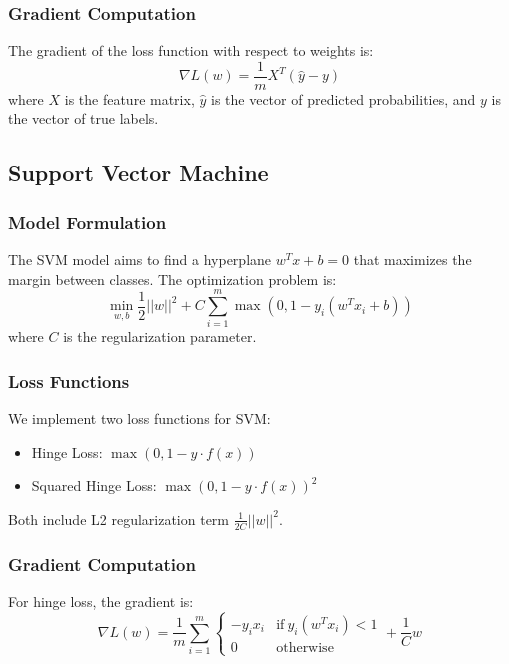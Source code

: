 \documentclass[journal, a4paper]{IEEEtran}
\begin{document}
\subsubsection{Gradient Computation}
The gradient of the loss function with respect to weights is:
\begin{equation}
\nabla L(w) = \frac{1}{m} X^T (\hat{y} - y)
\end{equation}
where $X$ is the feature matrix, $\hat{y}$ is the vector of predicted probabilities, and $y$ is the vector of true labels.

\subsection{Support Vector Machine}
\subsubsection{Model Formulation}
The SVM model aims to find a hyperplane $w^T x + b = 0$ that maximizes the margin between classes. The optimization problem is:
\begin{equation}
\min_{w,b} \frac{1}{2} ||w||^2 + C\sum_{i=1}^{m} \max(0, 1 - y_i(w^T x_i + b))
\end{equation}
where $C$ is the regularization parameter.

\subsubsection{Loss Functions}
We implement two loss functions for SVM:

\begin{itemize}
    \item Hinge Loss: $\max(0, 1 - y \cdot f(x))$
    \item Squared Hinge Loss: $\max(0, 1 - y \cdot f(x))^2$
\end{itemize}

Both include L2 regularization term $\frac{1}{2C} ||w||^2$.

\subsubsection{Gradient Computation}
For hinge loss, the gradient is:
\begin{equation}
\nabla L(w) = \frac{1}{m}\sum_{i=1}^{m} \begin{cases} 
-y_i x_i & \text{if}\ y_i(w^T x_i) < 1 \\
0 & \text{otherwise}
\end{cases} + \frac{1}{C}w
\end{equation}
\end{document}
